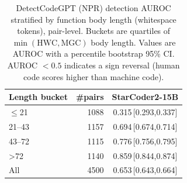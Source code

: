 \begin{table}[t]
\centering
\caption{DetectCodeGPT (NPR) detection AUROC stratified by function body length (whitespace tokens), pair-level. Buckets are quartiles of $\min(\text{HWC},\text{MGC})$ body length. Values are AUROC with a percentile bootstrap 95\% CI. AUROC $<0.5$ indicates a sign reversal (human code scores higher than machine code).}
\label{tab:auroc-by-length}
\begin{tabular}{lrc}
\toprule
Length bucket & \#pairs & StarCoder2-15B \\
\midrule
$\leq$21 & 1088 & 0.315\,\tiny[0.293,0.337] \\
21--43 & 1157 & 0.694\,\tiny[0.674,0.714] \\
43--72 & 1115 & 0.776\,\tiny[0.756,0.795] \\
>72 & 1140 & 0.859\,\tiny[0.844,0.874] \\
\midrule
All & 4500 & 0.653\,\tiny[0.643,0.664] \\
\bottomrule
\end{tabular}
\end{table}
